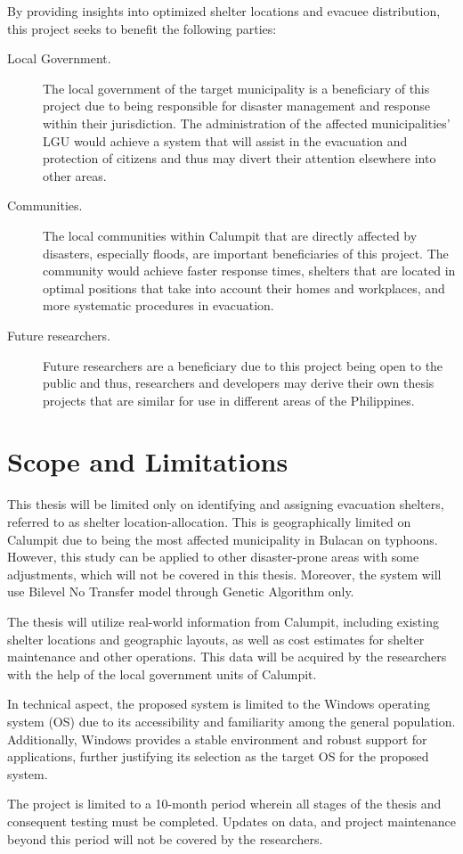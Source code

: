 	By providing insights into optimized shelter locations and evacuee distribution, this project seeks to benefit the following parties:
	
	\begin{description}
		\item[Local Government.] The local government of the target municipality is a beneficiary of this project due to being responsible for disaster management and response within their jurisdiction. The administration of the affected municipalities’ LGU would achieve a system that will assist in the evacuation and protection of citizens and thus may divert their attention elsewhere into other areas.
		
		\item[Communities.] The local communities within Calumpit that are directly affected by disasters, especially floods, are important beneficiaries of this project. The community would achieve faster response times, shelters that are located in optimal positions that take into account their homes and workplaces, and more systematic procedures in evacuation.
		
		\item[Future researchers.] Future researchers are a beneficiary due to this project being open to the public and thus, researchers and developers may derive their own thesis projects that are similar for use in different areas of the Philippines.
		
	\end{description}

\section{Scope and Limitations}
	This thesis will be limited only on identifying and assigning evacuation shelters, referred to as shelter location-allocation. This is geographically limited on Calumpit due to being the most affected municipality in Bulacan on typhoons. However, this study can be applied to other disaster-prone areas with some adjustments, which will not be covered in this thesis. Moreover, the system will use Bilevel No Transfer model through Genetic Algorithm only.
	
	The thesis will utilize real-world information from Calumpit, including existing shelter locations and geographic layouts, as well as cost estimates for shelter maintenance and other operations. This data will be acquired by the researchers with the help of the local government units of Calumpit.
	
	In technical aspect, the proposed system is limited to the Windows operating system (OS) due to its accessibility and familiarity among the general population. Additionally, Windows provides a stable environment and robust support for applications, further justifying its selection as the target OS for the proposed system.
	
	The project is limited to a 10-month period wherein all stages of the thesis and consequent testing must be completed. Updates on data, and project maintenance beyond this period will not be covered by the researchers.
